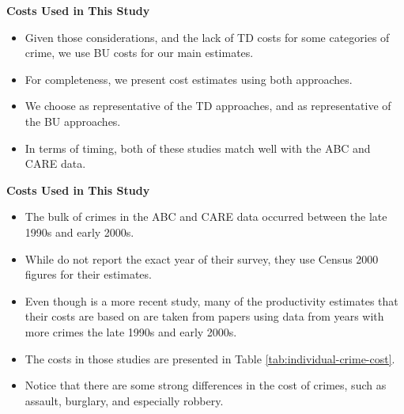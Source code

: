 \documentclass[static]{JJH-Beamer}
\begin{document}
\begin{frame}

\begin{center}
\textbf{Costs Used in This Study}
\end{center}
\begin{itemize}
\item Given those considerations, and the lack of TD costs for some categories of crime, we use BU costs for our main estimates.
\item For completeness, we present cost estimates using both approaches.
\item We choose \cite{Cohen_Rust_etal_2004_Criminology} as representative of the TD approaches, and \cite{McCollister_etal_2010_DAD} as representative of the BU approaches.
\item In terms of timing, both of these studies match well with the ABC and CARE data.
\end{itemize}

\end{frame}

\begin{frame}

\begin{center}
\textbf{Costs Used in This Study}
\end{center}
\begin{itemize}
\item The bulk of crimes in the ABC and CARE data occurred between the late 1990s and early 2000s.
\item While \cite{Cohen_Rust_etal_2004_Criminology} do not report the exact year of their survey, they use Census 2000 figures for their estimates.
\item Even though \cite{McCollister_etal_2010_DAD} is a more recent study, many of the productivity estimates that their costs are based on are taken from papers using data from years with more crimes the late 1990s and early 2000s.
\item The costs in those studies are presented in Table \ref{tab:individual-crime-cost}.
\item Notice that there are some strong differences in the cost of crimes, such as assault, burglary, and especially robbery.
\end{itemize}

\end{frame}
\end{document}
